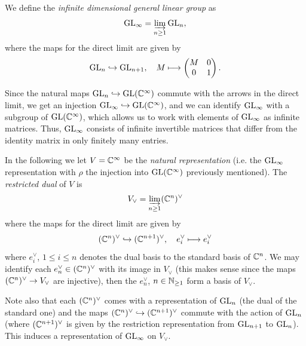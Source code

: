 \documentclass[11pt]{amsart}
\begin{document}
\begin{defin}
    We define the \emph{infinite dimensional general linear group} as
    \begin{align}
        \mathrm{GL}_\infty=\varinjlim_{n\geq1}\mathrm{GL}_n,
    \end{align}
    where the maps for the direct limit are given by
    \begin{align}
    \mathrm{GL}_n \hookrightarrow\mathrm{GL}_{n+1}, \quad M \longmapsto \begin{pmatrix}
            M & 0 \\
            0 & 1
        \end{pmatrix}.
    \end{align}
\end{defin}
Since the natural maps \(\mathrm{GL}_n \hookrightarrow \mathrm{GL} (\mathbb{C}^\infty)\) commute with the arrows in the direct limit, we get an injection \(\mathrm{GL}_\infty \hookrightarrow \mathrm{GL}(\mathbb{C}^\infty)\), and we can identify $\mathrm{GL}_\infty$ with a subgroup of $\mathrm{GL}(\mathbb{C}^\infty)$, which allows us to work with elements of $\mathrm{GL}_\infty$ as infinite matrices. Thus, \(\mathrm{GL}_\infty\) consists of infinite invertible matrices that differ from the identity matrix in only finitely many entries. 

\begin{defin}
    In the following we let $V = \mathbb{C}^\infty$ be the \emph{natural representation} (i.e. the $\mathrm{GL}_\infty$ representation with $\rho$ the injection into \(\mathrm{GL}(\mathbb{C}^\infty)\) previously mentioned). The \emph{restricted dual} of $V$ is
    \begin{align}
        V_\vee = \varinjlim_{n \geq 1} (\mathbb{C}^n)^\vee
    \end{align}
    where the maps for the direct limit are given by
    \begin{align}
        (\mathbb{C}^n)^\vee \hookrightarrow (\mathbb{C}^{n+1})^\vee, \quad
        e_i^\vee \longmapsto e_i^\vee
    \end{align}
    where $e_i^\vee$, $1 \leq i \leq n$ denotes the dual basis to the standard basis of $\mathbb{C}^n$. We may identify each \(e_n^\vee \in (\mathbb{C}^n)^\vee\) with its image in \(V_\vee\) (this makes sense since the maps \((\mathbb{C}^n)^\vee \rightarrow V_\vee \) are injective), then the \(e_n^\vee\), \(n \in \mathbb{N}_{\geq 1}\) form a basis of \(V_\vee\).
\end{defin}

     Note also that each \((\mathbb{C}^n)^\vee\) comes with a representation of \(\mathrm{GL}_n\) (the dual of the standard one) and the maps \((\mathbb{C}^n)^\vee \hookrightarrow (\mathbb{C}^{n + 1})^\vee\) commute with the action of \(\mathrm{GL}_n\) (where \((\mathbb{C}^{n + 1})^\vee\) is given by the restriction representation from \(\mathrm{GL}_{n + 1}\) to \(\mathrm{GL}_n\)). This induces a representation of \(\mathrm{GL}_\infty\) on \(V_\vee\).
\end{document}
